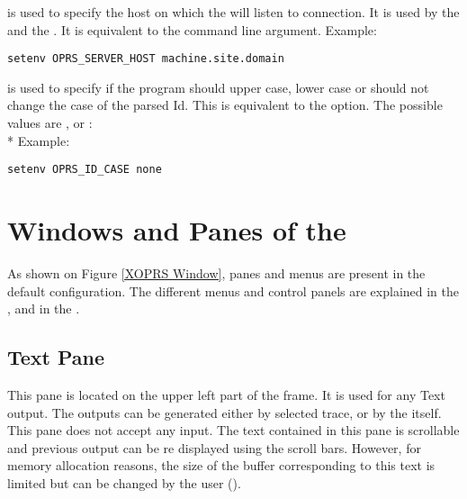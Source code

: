 \begin{description}
\item[\code{OPRS\_SERVER\_HOST}] is used  to specify the host on which the
\OPRSS{} will listen to connection. It is used by the \CPK{} and the
\XPK{}. It is equivalent to the  command line argument.
Example:
\begin{verbatim}
setenv OPRS_SERVER_HOST machine.site.domain
\end{verbatim}

\item[\code{OPRS\_ID\_CASE}] is used to specify if the program should upper case,
lower case or should not change the case of the parsed Id. This is equivalent
to the  option. The possible values
are ,  or :\\*
Example:
\begin{verbatim}
setenv OPRS_ID_CASE none
\end{verbatim}

\end{description}

\section{Windows and Panes of the \XPK{}}


As shown on Figure \ref{XOPRS Window}, panes and menus are present in the
default \XOPRS{} configuration. The different menus and control panels are
explained in the , and in the .



\subsection{Text Pane}

This pane is located on the upper left part of the \XOPRS{} frame.  It is used
for any Text output. The outputs can be generated either by selected trace, or
by the \CPK{} itself. This pane does not accept any input. The text contained
in this pane is scrollable and previous output can be re displayed using the
scroll bars. However, for memory allocation reasons, the size of the buffer
corresponding to this text is limited but can be changed by the user
().

